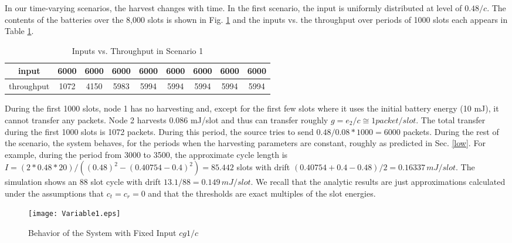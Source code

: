 \documentclass[12 pt]{article}
\newcommand{\debug}[1]{\mbox{\tt #1}}
\renewcommand{\debug}[1]{}              \newcommand{\cmd}[1]{}
\newcommand{\2}{\>\>}
\newcommand{\3}{\>\>\>}
\newcommand{\4}{\>\>\>\>}
\newcommand{\5}{\>\>\>\>\>}
\newcommand{\6}{\>\>\>\>\>\>}
\newcommand{\7}{\6\>}
\newcommand{\8}{\6\2}
\newcommand{\dref}[1]{\ref{#1}\debug{[#1]}\cmd{dref}}
\newcounter{protblock}
\newcounter{line}[protblock]
\begin{document}
In our time-varying scenarios, the harvest changes with time.  In the first scenario, the input is uniformly distributed at level of $0.48/c$.  The contents of the batteries over the 8,000 slots is shown in Fig. \dref{fig-Variable1} and the inputs vs. the throughput over periods of 1000 slots each appears in Table \dref{Table-Thru1}.

\begin{table}[hbtp]
\begin{center}
\begin{tabular}{|c|c|c|c|c|c|c|c|c|}
  \hline
input &  6000 & 6000 &  6000 &  6000& 6000 & 6000  & 6000  & 6000  \\ \hline
throughput & 1072 & 4150 &  5983 & 5994 & 5994  & 5994 & 5994 & 5994  \\ \hline


\end{tabular}
\caption{Inputs vs. Throughput in Scenario 1\debug{\fbox{Table-Thru1}}\label{Table-Thru1}}
\end{center}
\end{table}


During the first 1000 slots, node 1 has no harvesting and, except for the first few slots where it uses the initial battery energy (10 mJ), it cannot transfer any packets.  Node 2 harvests 0.086 mJ/slot and thus can transfer roughly $g = e_2/c \cong 1 packet/slot$.
The total transfer during the first 1000 slots is 1072 packets.  During this period, the source tries to send $0.48/0.08 * 1000 = 6000$ packets.
During the rest of the scenario, the system behaves, for the periods when the harvesting parameters are constant, roughly as predicted in Sec. \dref{low}.
For example, during the period from 3000 to 3500, the approximate cycle length is $I = (2 * 0.48 * 20)/((0.48)^2 - (0.40754 - 0.4)^2) = 85.442$ slots with drift
$(0.40754 + 0.4 - 0.48)/2 = 0.16337 \, mJ/slot$.  The simulation shows an 88 slot cycle with drift $13.1/88 = 0.149 \, mJ/slot$.  We recall that the analytic results are just approximations calculated under the assumptions that $c_t = c_r = 0$ and that the thresholds are exact multiples of the slot energies.

\begin{figure}[hbtp]
\begin{center}
\texttt{[image: Variable1.eps]}
\caption{Behavior of the System with Fixed Input $cg1/c$\debug{\fbox{fig-Variable1}}\label{fig-Variable1}}
\end{center}
\end{figure}
\end{document}
